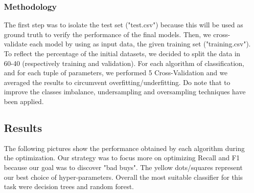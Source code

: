 \documentclass{article}
\begin{document}
	
	\subsubsection{Methodology}
	The first step was to isolate the test set ("test.csv") because this will be used as ground truth to verify the performance of the final models. Then, we cross-validate each model by using as input data, the given training set ("training.csv"). To reflect the percentage of the initial datasets, we decided to split the data in 60-40 (respectively training and validation). For each algorithm of classification, and for each tuple of parameters, we performed 5 Cross-Validation and we averaged the results to circumvent overfitting/underfitting. Do note that to improve the classes imbalance, undersampling and oversampling techniques have been applied.
	
	\subsection{Results}
	The following pictures show the performance obtained by each algorithm during the optimization. Our strategy was to focus more on optimizing Recall and F1 because our goal was to discover "bad buys". The yellow dots/squares represent our best choice of hyper-parameters. Overall the most suitable classifier for this task were decision trees and random forest.
	
\end{document}
